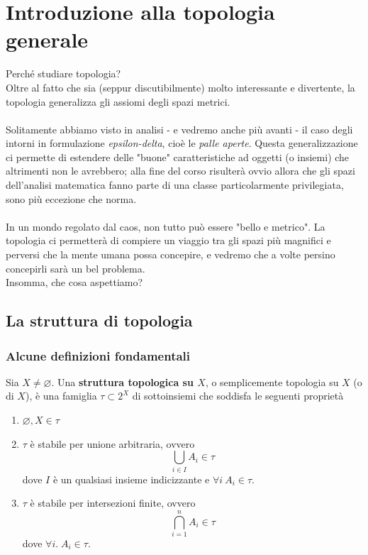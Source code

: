 \chapter{Introduzione alla topologia generale}


Perché studiare topologia? \\
Oltre al fatto che sia (seppur discutibilmente) molto interessante e divertente, la topologia generalizza gli assiomi degli spazi metrici. \\ \\ 
Solitamente abbiamo visto in analisi - e vedremo anche più avanti - il caso degli intorni in formulazione \textit{epsilon-delta}, cioè le \textit{palle aperte}. Questa generalizzazione ci permette di estendere delle "buone" caratteristiche ad oggetti (o insiemi) che altrimenti non le avrebbero; alla fine del corso risulterà ovvio allora che gli spazi dell'analisi matematica fanno parte di una classe particolarmente privilegiata, sono più eccezione che norma. \\ \\ In un mondo regolato dal caos, non tutto può essere "bello e metrico". La topologia ci permetterà di compiere un viaggio tra gli spazi più magnifici e perversi che la mente umana possa concepire, e vedremo che a volte persino concepirli sarà un bel problema. \\
Insomma, che cosa aspettiamo?



\newpage
\section{La struttura di topologia}
\subsection{\textcolor{TopGener}{\textbf{Alcune definizioni fondamentali}}}


\begin{definition}
	Sia $X \neq \varnothing$. Una \textbf{struttura topologica su $X$}, o semplicemente topologia su $X$ (o di $X$), è una famiglia $\tau\subset 2^X$ di sottoinsiemi  che soddisfa le seguenti proprietà
	\begin{enumerate}
		\item $\varnothing, X \in \tau$
		\item $\tau$ è stabile per unione arbitraria, ovvero 
		\begin{equation*}
			\bigcup_{i \in I} A_i \in \tau 	
		\end{equation*}
		dove $I$ è un qualsiasi insieme indicizzante e $\forall i \  A_i \in \tau$.
		\item $\tau$ è stabile per intersezioni finite, ovvero 
		\begin{equation*}
			\bigcap^n_{i=1} A_i \in \tau
		\end{equation*}
		dove $\forall i. \; A_i \in \tau$.
	\end{enumerate} 
\end{definition}

